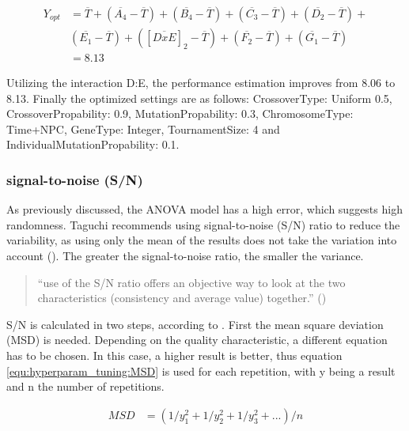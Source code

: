 \begin{equation} \label{equ:hyperparameter_tuning:optimum_perf_included_interaction}
	\begin{split}
		Y_{opt} &= \overline{T} + (\overline{A_4} - \overline{T}) + (\overline{B_4} - \overline{T}) + (\overline{C_3} - \overline{T}) + (\overline{D_2} - \overline{T}) + \\& (\overline{E_1} - \overline{T})  + ([\overline{DxE}]_2 - \overline{T})  + (\overline{F_2} - \overline{T}) + (\overline{G_1} - \overline{T}) \\
		&= 8.13
	\end{split}
\end{equation}

Utilizing the interaction D:E, the performance estimation improves from 8.06 to 8.13. Finally the optimized settings are as follows:
CrossoverType: Uniform 0.5, CrossoverPropability: 0.9, MutationPropability: 0.3, ChromosomeType: Time+NPC, GeneType: Integer, TournamentSize: 4 and IndividualMutationPropability: 0.1.

\subsubsection{signal-to-noise (S/N)}
As previously discussed, the ANOVA model has a high error, which suggests high randomness. Taguchi recommends using signal-to-noise (S/N) ratio to reduce the variability, as using only the mean of the results does not take the variation into account (\cite{roy_primer_1990}). The greater the signal-to-noise ratio, the smaller the variance.

\begin{quote}
	\begin{em}
		\enquote{use of the S/N ratio offers an objective way to look at the two characteristics (consistency and average value) together.} (\cite{roy_primer_1990})
	\end{em}
\end{quote}

S/N is calculated in two steps, according to \cite{roy_primer_1990}. First the mean square deviation (MSD) is needed. Depending on the quality characteristic, a different equation has to be chosen. In this case, a higher result is better, thus equation \ref{equ:hyperparam_tuning:MSD} is used for each repetition, with y being a result and n the number of repetitions.

\begin{equation} \label{equ:hyperparam_tuning:MSD}
	\begin{split}
		MSD & = (1/y^2_1 + 1/y^2_2 + 1/y^2_3 + ... ) / n
	\end{split}
\end{equation}

